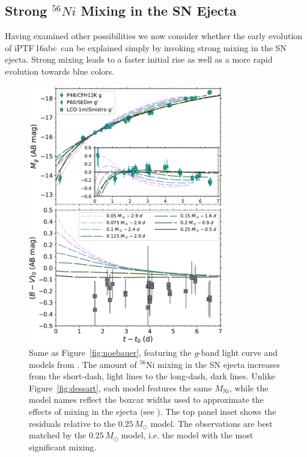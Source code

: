 \documentclass[twocolumn]{aastex61}
\newcommand{\abc}{iPTF\,16abc}
\begin{document}
\subsection{Strong $^{56}Ni$ Mixing in the SN Ejecta}
\label{sec:Ni_mixing}

Having examined other possibilities we now consider whether the early evolution of \abc\ can be explained simply by invoking strong mixing in the 
SN ejecta. Strong mixing leads to a faster initial rise as well as a more rapid evolution towards blue colors.

\begin{figure}[]
  \centering
  \includegraphics[width=3.35in]{compare_Piro.pdf}
  \caption{
  Same as Figure~\ref{fig:noebauer}, featuring the $g$-band light
  curve and models from \citet{2016ApJ...826...96P}. The amount of $^{56}$Ni
  mixing in the SN ejecta increases from the short-dash, light lines to the
  long-dash, dark lines. Unlike Figure~\ref{fig:dessart}, each model features
  the same $M_\mathrm{Ni}$, while the model names reflect the boxcar widths
  used to approximate the effects of mixing in the ejecta (see
  \citealt{2016ApJ...826...96P}). The top panel inset shows the residuals
  relative to the $0.25\,M_\odot$ model. The observations are best matched by
  the $0.25\,M_\odot$ model, i.e. the model with the most significant mixing.}
  \label{fig:piro}
\end{figure}
\end{document}
